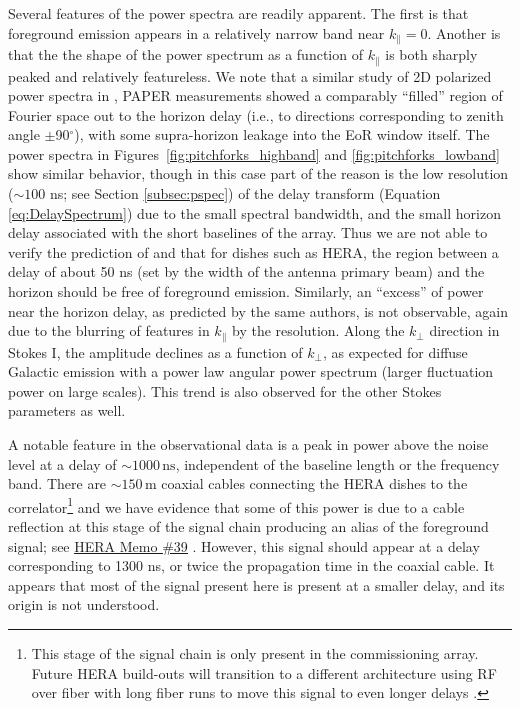 \documentclass[twocolumn, trackchanges]{aastex61}
\begin{document}
{Several features of the power spectra are readily apparent.  The first is that foreground emission appears in a relatively narrow band near $k_\parallel = 0$.  Another is that the the shape of the power spectrum as a function of $k_\parallel$ is both sharply peaked and relatively featureless.  We note that a similar study of 2D polarized power spectra in \citet{Kohn16}, PAPER measurements showed a comparably ``filled'' region of Fourier space out to the horizon delay (i.e., to directions corresponding to zenith angle $\pm$90$^{\circ}$), with some supra-horizon leakage \citep[e.g.,][]{Pober13} into the EoR window itself. The power spectra in Figures~\ref{fig:pitchforks_highband} and \ref{fig:pitchforks_lowband} show similar behavior, though in this case part of the reason is the low resolution ($\sim100$ ns; see Section \ref{subsec:pspec}) of the delay transform (Equation \ref{eq:DelaySpectrum}) due to the small spectral bandwidth, and the small horizon delay associated with the short baselines of the array.   Thus we are not able to verify the prediction of \citet{Nithya.15b} and \citet{Neben.16} that for dishes such as HERA, the region between a delay of about 50 ns (set by the width of the antenna primary beam) and the horizon should be free of foreground emission.  Similarly, an ``excess'' of power near the horizon delay, as predicted by the same authors, is not observable, again due to the blurring of features in $k_\parallel$ by the resolution.  Along the $k_\perp$ direction in Stokes I, the amplitude declines as a function of $k_\perp$, as expected for diffuse Galactic emission with a power law angular power spectrum (larger fluctuation power on large scales).  This trend is also observed for the other Stokes parameters as well.

A notable feature in the observational data is a peak in power above the noise level at a delay of $\sim1000 \, \mathrm{ns}$, independent of the baseline length or the frequency band.   There are $\sim 150 \, \mathrm{m}$ coaxial cables connecting the HERA dishes to the correlator\footnote{This stage of the signal chain is only present in the commissioning array. Future HERA build-outs will transition to a different architecture using RF over fiber with long fiber runs to move this signal to even longer delays \citep{deBoer17}.} and we have evidence that some of this power is due to a cable reflection at this stage of the signal chain producing an alias of the foreground signal; see \href{http://reionization.org/wp-content/uploads/2013/03/HERA39_H1C_cable_reflections_ewall-wice.pdf}{\underline{HERA Memo \#39}} \citep{hera_memo39}.  However, this signal should appear at a delay corresponding to 1300 ns, or twice the propagation time in the coaxial cable.  It appears that most of the signal present here is present at a smaller delay, and its origin is not understood.

}
\end{document}
